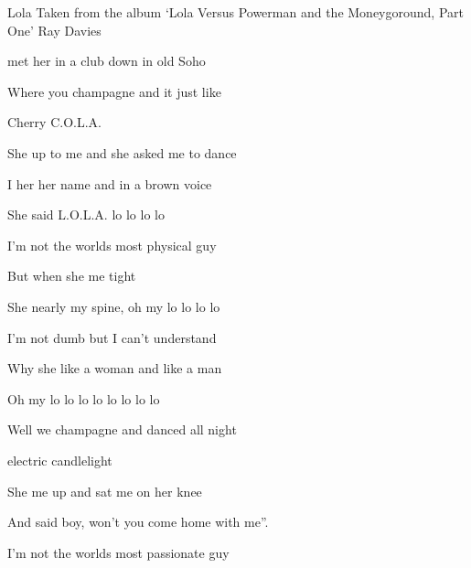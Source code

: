 \begin{SBSong}{Lola}
  {Taken from the album `Lola Versus Powerman and the Moneygoround, Part One'}
  {Ray Davies}
  \begin{SBVerse}
     met her in a club down in old Soho
                         
    Where you  champagne and it  just like
                
    Cherry  C.O.L.A. 
  \end{SBVerse}
  \begin{SBVerse}
    She  up to me and she asked me to dance
                                                   
    I  her her name and in a  brown voice
                    
    She said  L.O.L.A.  lo lo lo lo 
  \end{SBVerse}
  \begin{SBVerse}
     I'm not the worlds most physical guy
                            
    But when she  me tight
                                                           
    She nearly  my spine, oh my  lo lo lo lo 
  \end{SBVerse}
  \begin{SBVerse}
     I'm not dumb but I can't understand
                                                           
    Why she  like a woman and  like a man
                 
    Oh my  lo lo lo lo  lo lo lo lo 
  \end{SBVerse}
  \begin{SBVerse}                
    Well we  champagne and danced all night

     electric candlelight
           
    She  me up and sat me on her knee

    And said  boy, won't you come home with me''.
  \end{SBVerse}
  \begin{SBVerse}
     I'm not the worlds most passionate guy
                                                                                            

\end{SBVerse}
\end{SBSong}
